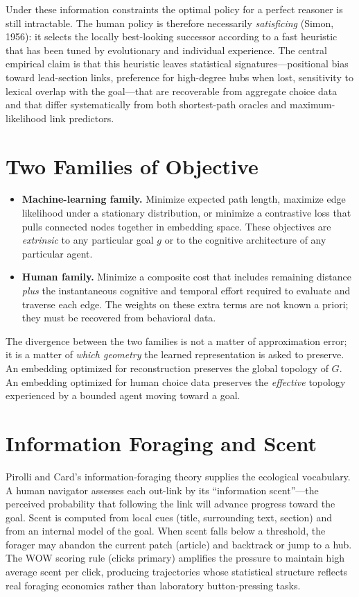 \documentclass[11pt,a4paper]{report}
\begin{document}
Under these information constraints the optimal policy for a perfect reasoner is still intractable. The human policy is therefore necessarily \textit{satisficing} (Simon, 1956): it selects the locally best-looking successor according to a fast heuristic that has been tuned by evolutionary and individual experience. The central empirical claim is that this heuristic leaves statistical signatures—positional bias toward lead-section links, preference for high-degree hubs when lost, sensitivity to lexical overlap with the goal—that are recoverable from aggregate choice data and that differ systematically from both shortest-path oracles and maximum-likelihood link predictors.

\section{Two Families of Objective}

\begin{itemize}
    \item \textbf{Machine-learning family.} Minimize expected path length, maximize edge likelihood under a stationary distribution, or minimize a contrastive loss that pulls connected nodes together in embedding space. These objectives are \textit{extrinsic} to any particular goal \(g\) or to the cognitive architecture of any particular agent.
    \item \textbf{Human family.} Minimize a composite cost that includes remaining distance \textit{plus} the instantaneous cognitive and temporal effort required to evaluate and traverse each edge. The weights on these extra terms are not known a priori; they must be recovered from behavioral data.
\end{itemize}

The divergence between the two families is not a matter of approximation error; it is a matter of \textit{which geometry} the learned representation is asked to preserve. An embedding optimized for reconstruction preserves the global topology of \(G\). An embedding optimized for human choice data preserves the \textit{effective} topology experienced by a bounded agent moving toward a goal.

\section{Information Foraging and Scent}

Pirolli and Card’s information-foraging theory supplies the ecological vocabulary. A human navigator assesses each out-link by its “information scent”—the perceived probability that following the link will advance progress toward the goal. Scent is computed from local cues (title, surrounding text, section) and from an internal model of the goal. When scent falls below a threshold, the forager may abandon the current patch (article) and backtrack or jump to a hub. The WOW scoring rule (clicks primary) amplifies the pressure to maintain high average scent per click, producing trajectories whose statistical structure reflects real foraging economics rather than laboratory button-pressing tasks.
\end{document}
